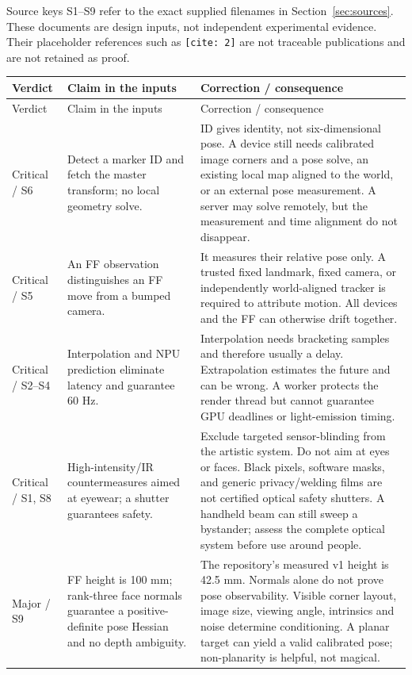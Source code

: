 \documentclass[11pt,a4paper]{article}
\begin{document}
Source keys S1--S9 refer to the exact supplied filenames in
Section~\ref{sec:sources}. These documents are design inputs, not independent
experimental evidence. Their placeholder references such as
\texttt{[cite: 2]} are not traceable publications and are not retained as proof.

\small
\begin{longtable}{@{}L{25mm}L{56mm}L{74mm}@{}}
\toprule
Verdict & Claim in the inputs & Correction / consequence\\
\midrule
\endfirsthead
\toprule Verdict & Claim in the inputs & Correction / consequence\\ \midrule
\endhead
\bottomrule\endfoot
Critical / S6 &
Detect a marker ID and fetch the master transform; no local geometry solve. &
ID gives identity, not six-dimensional pose. A device still needs calibrated
image corners and a pose solve, an existing local map aligned to the world,
or an external pose measurement. A server may solve remotely, but the
measurement and time alignment do not disappear.\\
Critical / S5 &
An FF observation distinguishes an FF move from a bumped camera. &
It measures their relative pose only. A trusted fixed landmark, fixed
camera, or independently world-aligned tracker is required to attribute
motion. All devices and the FF can otherwise drift together.\\
Critical / S2--S4 &
Interpolation and NPU prediction eliminate latency and guarantee 60 Hz. &
Interpolation needs bracketing samples and therefore usually a delay.
Extrapolation estimates the future and can be wrong. A worker protects the
render thread but cannot guarantee GPU deadlines or light-emission timing.\\
Critical / S1, S8 &
High-intensity/IR countermeasures aimed at eyewear; a shutter guarantees safety. &
Exclude targeted sensor-blinding from the artistic system. Do not aim at
eyes or faces. Black pixels, software masks, and generic privacy/welding
films are not certified optical safety shutters. A handheld beam can still
sweep a bystander; assess the complete optical system before use around
people.\\
Major / S9 &
FF height is 100 mm; rank-three face normals guarantee a positive-definite
pose Hessian and no depth ambiguity. &
The repository's measured v1 height is 42.5 mm. Normals alone do not prove
pose observability. Visible corner layout, image size, viewing angle,
intrinsics and noise determine conditioning. A planar target can yield a
valid calibrated pose; non-planarity is helpful, not magical.\\

\end{longtable}
\end{document}
